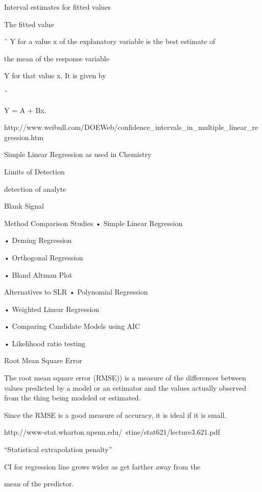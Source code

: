 
Interval estimates for fitted values

The fitted value

ˆ Y for a value x of the explanatory variable is the best estimate of

the mean of the response variable

Y for that value x. It is given by

ˆ

Y = A + Bx.



http://www.weibull.com/DOEWeb/confidence_intervals_in_multiple_linear_regression.htm



Simple Linear Regression as used in Chemistry

Limits of Detection

detection of analyte

Blank Signal


Method Comparison Studies
•
Simple Linear Regression

•
Deming Regression

•
Orthogonal Regression

•
Bland Altman Plot




Alternatives to SLR
•
Polynomial Regression

•
Weighted Linear Regression

•
Comparing Candidate Models using AIC 

•
Likelihood ratio testing



Root Mean Square Error

The root mean square error (RMSE)) is a measure of the differences between values predicted by a model or an estimator and the values actually observed from the thing being modeled or estimated.


Since the RMSE is a good measure of accuracy, it is ideal if it is small.













http://www-stat.wharton.upenn.edu/~stine/stat621/lecture3.621.pdf


“Statistical extrapolation penalty”

CI for regression line grows wider as get farther away from the

mean of the predictor.

